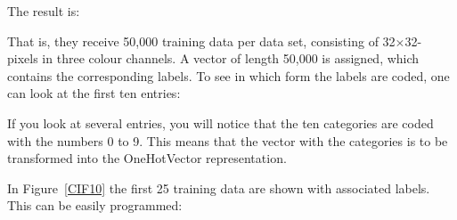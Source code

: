 


\medskip

The result is:

\medskip





\medskip

That is, they receive 50,000 training data per data set, consisting of 32$\times$32- pixels in three colour channels. 
A vector of length 50,000 is assigned, which contains the corresponding labels. To see in which form the labels are coded, one can look at the first ten entries:

\medskip


\PYTHON{}

\PYTHON{[6]}

\PYTHON{\quad [9]}

\PYTHON{\quad [9]}

\PYTHON{\quad [4]}

\PYTHON{\quad [1]}

\PYTHON{\quad [1]}

\PYTHON{\quad [2]}

\PYTHON{\quad [7]}

\PYTHON{\quad [8]}

\PYTHON{\quad [3]]}

\medskip

If you look at several entries, you will notice that the ten categories are coded with the numbers 0 to 9. This means that the vector with the categories is to be transformed into the OneHotVector representation.

In Figure~\ref{CIF10} the first 25 training data are shown with associated labels. This can be easily programmed:


\medskip




